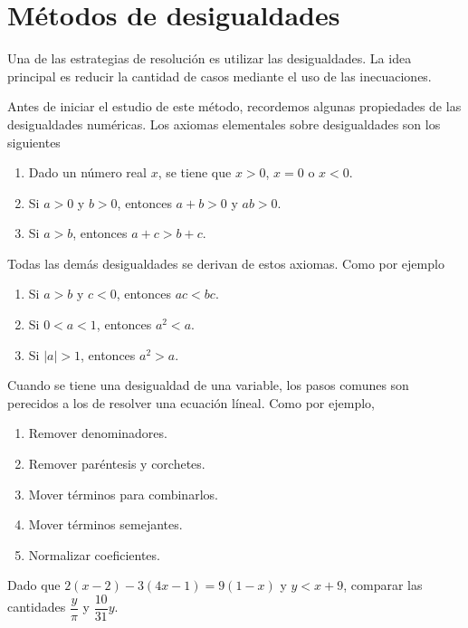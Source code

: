 \section{Métodos de desigualdades}

Una de las estrategias de resolución es utilizar las desigualdades.
La idea principal es reducir la cantidad de casos mediante el uso de las inecuaciones.

Antes de iniciar el estudio de este método, recordemos algunas propiedades de las desigualdades numéricas.
Los axiomas elementales sobre desigualdades son los siguientes

\begin{enumerate}
    \item Dado un número real $x$, se tiene que $x > 0$, $x = 0$ o $x < 0$.
    \item Si $a > 0$ y $b > 0$, entonces $a + b > 0$ y $ab > 0$.
    \item Si $a > b$, entonces $a + c > b + c$.
\end{enumerate}
Todas las demás desigualdades se derivan de estos axiomas.
Como por ejemplo
\begin{enumerate}
    \item Si $a > b$ y $c < 0$, entonces $ac < bc$.
    \item Si $0 < a < 1$, entonces $a^2 < a$.
    \item Si $|a| > 1$, entonces $a^2 > a$.
\end{enumerate}

Cuando se tiene una desigualdad de una variable, los pasos comunes son perecidos a los de resolver una ecuación líneal.
Como por ejemplo,
\begin{multicols}{2}
    \begin{enumerate}
        \item Remover denominadores.
        \item Remover paréntesis y corchetes.
        \item Mover términos para combinarlos.
        \item Mover términos semejantes.
        \item Normalizar coeficientes.
    \end{enumerate}
\end{multicols}

\begin{example}
    Dado que $2(x - 2) - 3(4x - 1) = 9(1 - x)$ y $y < x + 9$, comparar las cantidades $\dfrac{y}{\pi}$ y $\dfrac{10}{31}y$.
\end{example}


